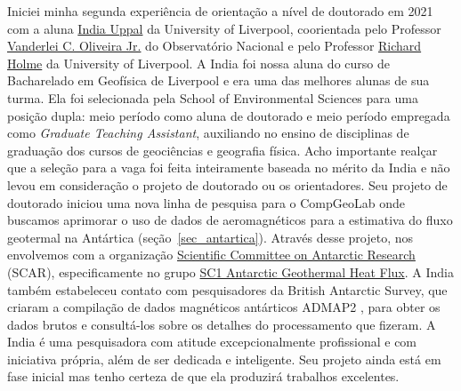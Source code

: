 \documentclass[10pt,a4paper,oneside]{book}
\newcommand{\IndiaLink}{\href{https://www.compgeolab.org/team/\#indiauppal}{India Uppal}}
\begin{document}
Iniciei minha segunda experiência de orientação a nível de doutorado em 2021
com a aluna \IndiaLink{} da University of Liverpool, coorientada pelo Professor
\href{https://www.pinga-lab.org/people/oliveira-jr.html}{Vanderlei C. Oliveira Jr.}
do Observatório Nacional e pelo Professor
\href{https://www.liverpool.ac.uk/~holme/}{Richard Holme} da University of
Liverpool.
A India foi nossa aluna do curso de Bacharelado em Geofísica de Liverpool e era
uma das melhores alunas de sua turma.
Ela foi selecionada pela School of Environmental Sciences para uma posição
dupla: meio período como aluna de doutorado e meio período empregada como
\textit{Graduate Teaching Assistant}, auxiliando no ensino de disciplinas de
graduação dos cursos de geociências e geografia física.
Acho importante realçar que a seleção para a vaga foi feita inteiramente
baseada no mérito da India e não levou em consideração o projeto de doutorado
ou os orientadores.
Seu projeto de doutorado iniciou uma nova linha de pesquisa para o CompGeoLab
onde buscamos aprimorar o uso de dados de aeromagnéticos para a estimativa do
fluxo geotermal na Antártica (seção~\ref{sec_antartica}).
Através desse projeto, nos envolvemos com a organização
\href{https://www.scar.org/}{Scientific Committee on Antarctic Research}
(SCAR), especificamente no grupo
\href{https://www.scar-instant.org/index.php/research-themes/theme-2-solid-earth-ice-interactions/sc1-antarctic-geothermal-heat-flux}{SC1
Antarctic Geothermal Heat Flux}.
A India também estabeleceu contato com pesquisadores da British Antarctic
Survey, que criaram a compilação de dados magnéticos antárticos ADMAP2
\citep{Golynsky2018}, para obter os dados brutos e consultá-los sobre os
detalhes do processamento que fizeram.
A India é uma pesquisadora com atitude excepcionalmente profissional e
com iniciativa própria, além de ser dedicada e inteligente.
Seu projeto ainda está em fase inicial mas tenho certeza de que ela produzirá
trabalhos excelentes.
\end{document}
